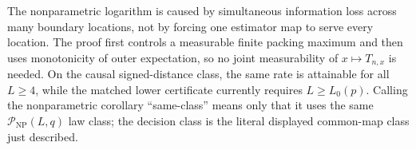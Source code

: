 The nonparametric logarithm is caused by simultaneous information loss across many boundary locations, not by forcing one estimator map to serve every location.  The proof first controls a measurable finite packing maximum and then uses monotonicity of outer expectation, so no joint measurability of \(x\mapsto T_{n,x}\) is needed.  On the causal signed-distance class, the same rate is attainable for all \(L\geq4\), while the matched lower certificate currently requires \(L\geq L_0(p)\).  Calling the nonparametric corollary ``same-class'' means only that it uses the same \(\mathcal P_{\mathrm{NP}}(L,q)\) law class; the decision class is the literal displayed common-map class just described.